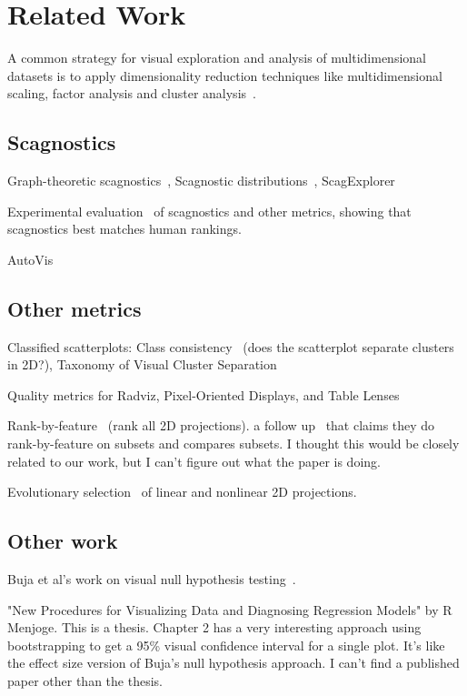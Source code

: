 \section{Related Work}

A common strategy for visual exploration and analysis of multidimensional datasets is to apply dimensionality reduction techniques like multidimensional scaling, factor analysis and cluster analysis~\cite{Yang2003}. 

\subsection{Scagnostics}

Graph-theoretic scagnostics~\cite{Wilkinson2005}, Scagnostic distributions~\cite{Wilkinson2008}, ScagExplorer~\cite{Dang2014}

Experimental evaluation~\cite{Lehmann2015} of scagnostics and other metrics, showing that scagnostics best matches human rankings.

AutoVis~\cite{Wills2010}

\subsection{Other metrics}

Classified scatterplots: Class consistency~\cite{Sips2009} (does the scatterplot separate clusters in 2D?), Taxonomy of Visual Cluster Separation~\cite{Sedlmair2012}

Quality metrics for Radviz, Pixel-Oriented Displays, and Table Lenses~\cite{Albuquerque2010}

Rank-by-feature~\cite{Seo2005} (rank all 2D projections). a follow up~\cite{Piringer2008} that claims they do rank-by-feature on subsets and compares subsets. I thought this would be closely related to our work, but I can't figure out what the paper is doing.

Evolutionary selection~\cite{Boukhelifa2013} of linear and nonlinear 2D projections.

\subsection{Other work}
Buja et al's work on visual null hypothesis testing~\cite{Buja2009}.

"New Procedures for Visualizing Data and Diagnosing Regression Models" by R Menjoge. This is a thesis. Chapter 2 has a very interesting approach using bootstrapping to get a 95\% visual confidence interval for a single plot. It's like the effect size version of Buja's null hypothesis approach. I can't find a published paper other than the thesis.
